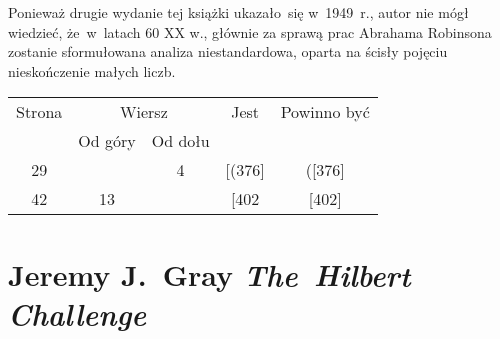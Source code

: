 \documentclass[a4paper,11pt]{article}
\numberwithin{equation}{section}
\begin{document}
\noindent
{} Ponieważ drugie wydanie tej książki ukazało~się w~1949~r.,
autor nie mógł wiedzieć, że~w~latach 60 XX w., głównie za sprawą
prac Abrahama Robinsona zostanie sformułowana analiza niestandardowa,
oparta na ścisły pojęciu nieskończenie małych liczb.





\newpage



\begin{center}

  \begin{tabular}{|c|c|c|c|c|}
    \hline
    Strona & \multicolumn{2}{c|}{Wiersz} & Jest
                              & Powinno być \\ \cline{2-3}
    & Od góry & Od dołu & & \\
    \hline
    29  & &  4 & [(376] & ([376] \\
    42  & 13 & & [402 & [402] \\
    \hline
  \end{tabular}

\end{center}

\VerSpaceTwo















\newpage

\section{Jeremy J.~Gray \textit{The~Hilbert Challenge}
  \parencite{Gray-The-Hilbert-Challenge-Pub-2000}}

\label{sec:Gray-The-Hilbert-Challenge}



\end{document}
